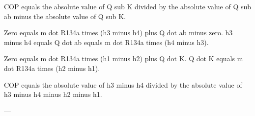 COP equals the absolute value of Q sub K divided by the absolute value of Q sub ab minus the absolute value of Q sub K.  

Zero equals m dot R134a times (h3 minus h4) plus Q dot ab minus zero.  
h3 minus h4 equals Q dot ab equals m dot R134a times (h4 minus h3).  

Zero equals m dot R134a times (h1 minus h2) plus Q dot K.  
Q dot K equals m dot R134a times (h2 minus h1).  

COP equals the absolute value of h3 minus h4 divided by the absolute value of h3 minus h4 minus h2 minus h1.  

---